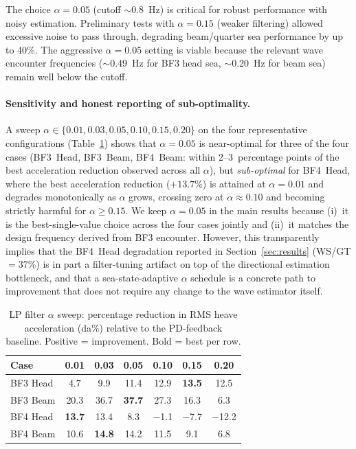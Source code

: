 \documentclass[review]{elsarticle}
\begin{document}
The choice $\alpha=0.05$ (cutoff $\sim$0.8~Hz) is critical for
robust performance with noisy estimation.
Preliminary tests with $\alpha=0.15$ (weaker filtering) allowed
excessive noise to pass through, degrading beam/quarter sea
performance by up to 40\%.
The aggressive $\alpha=0.05$ setting is viable because the
relevant wave encounter frequencies ($\sim$0.49~Hz for BF3 head
sea, $\sim$0.20~Hz for beam sea) remain well below the cutoff.

\paragraph{Sensitivity and honest reporting of sub-optimality.}
A sweep $\alpha\in\{0.01, 0.03, 0.05, 0.10, 0.15, 0.20\}$ on the
four representative configurations (Table~\ref{tab:lpalpha}) shows
that $\alpha=0.05$ is near-optimal for three of the four cases
(BF3~Head, BF3~Beam, BF4~Beam: within 2--3~percentage points of the
best acceleration reduction observed across all $\alpha$), but
\emph{sub-optimal} for BF4~Head, where the best acceleration
reduction ($+13.7\%$) is attained at $\alpha=0.01$ and degrades
monotonically as $\alpha$ grows, crossing zero at $\alpha\approx 0.10$
and becoming strictly harmful for $\alpha\geq 0.15$.  We keep
$\alpha=0.05$ in the main results because (i)~it is the
best-single-value choice across the four cases jointly and (ii)~it
matches the design frequency derived from BF3 encounter.  However,
this transparently implies that the BF4~Head degradation reported
in Section~\ref{sec:results} (WS/GT $=37\%$) is in part a filter-tuning
artifact on top of the directional estimation bottleneck, and that a
sea-state-adaptive $\alpha$ schedule is a concrete path to improvement
that does not require any change to the wave estimator itself.

\begin{table}[t]
\centering
\caption{LP filter $\alpha$ sweep: percentage reduction in
RMS heave acceleration (da\%) relative to the PD-feedback
baseline. Positive = improvement. Bold = best per row.}
\label{tab:lpalpha}
\begin{tabular}{lcccccc}
\toprule
Case & 0.01 & 0.03 & 0.05 & 0.10 & 0.15 & 0.20 \\
\midrule
BF3 Head & 4.7  & 9.9  & 11.4 & 12.9 & \textbf{13.5} & 12.5 \\
BF3 Beam & 20.3 & 36.7 & \textbf{37.7} & 27.3 & 16.3 &  6.3 \\
BF4 Head & \textbf{13.7} & 13.4 &  8.3 & $-$1.1 & $-$7.7 & $-$12.2 \\
BF4 Beam & 10.6 & \textbf{14.8} & 14.2 & 11.5 &  9.1 &  6.8 \\
\bottomrule
\end{tabular}
\end{table}
\end{document}
